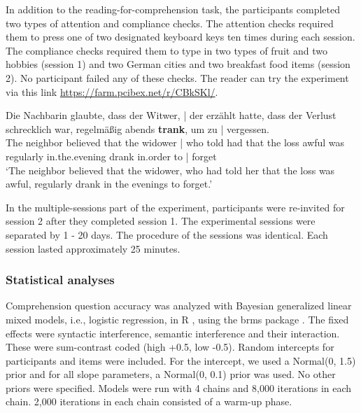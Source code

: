 \documentclass[a4paper, man, floatsintext]{apa7}
\begin{document}
In addition to the reading-for-comprehension task, the participants completed two types of attention and compliance checks. The attention checks required them to press one of two designated keyboard keys ten times during each session. The compliance checks required them to type in two types of fruit and two hobbies (session 1) and two German cities and two breakfast food items (session 2). No participant failed any of these checks. The reader can try the experiment via this link \hyperlink{https://farm.pcibex.net/r/CBkSKl/}{https://farm.pcibex.net/r/CBkSKl/}. 

\begin{exe}  
\ex \label{ex:linebreak}
    \gll Die Nachbarin glaubte, dass der Witwer, | der erzählt hatte, dass der Verlust schrecklich war, regelmäßig abends \textbf{trank}, um zu | vergessen. \\ 
    The neighbor believed that the widower | who told had that the loss awful was regularly in.the.evening drank in.order to | forget\\
    \trans  `The neighbor believed that the widower, who had told her that the loss was awful, regularly drank in the evenings to forget.'\\  
\end{exe}

In the multiple-sessions part of the experiment, participants were re-invited for session 2 after they completed session 1. The experimental sessions were separated by 1 - 20 days. The procedure of the sessions was identical. Each session lasted approximately 25 minutes.

\subsubsection{Statistical analyses}
Comprehension question accuracy was analyzed with Bayesian generalized linear mixed models, i.e., logistic regression, in R \citep{r}, using the brms package \citep{brms}. The fixed effects were syntactic interference, semantic interference and their interaction. These were sum-contrast coded (high +0.5, low -0.5). Random intercepts for participants and items were included. For the intercept, we used a Normal(0, 1.5) prior and  for all slope parameters, a Normal(0, 0.1) prior was used. No other priors were specified. Models were run with 4 chains and 8,000 iterations in each chain. 2,000 iterations in each chain consisted of a warm-up phase.
\end{document}
